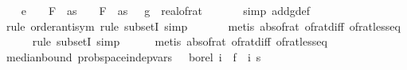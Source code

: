 \begin{isabellebody}
\ \ \isamarkupfalse%
\ e{\isacharcolon}{\kern0pt}\ {\isachardoublequoteopen}{\isacharbraceleft}{\kern0pt}{\isasymomega}{\isachardot}{\kern0pt}\ {\isasymdelta}\ {\isacharasterisk}{\kern0pt}\ F\ {}\ as\ {\isasymge}\ {\isasymbar}{\isasymomega}\ {\isacharminus}{\kern0pt}\ F\ {}\ as{\isasymbar}{\isacharbraceright}{\kern0pt}\ {\isacharequal}{\kern0pt}\ {\isacharbraceleft}{\kern0pt}{\isasymomega}{\isachardot}{\kern0pt}\ {\isacharparenleft}{\kern0pt}g\ {\isasymcirc}\ real{\isacharunderscore}{\kern0pt}of{\isacharunderscore}{\kern0pt}rat{\isacharparenright}{\kern0pt}\ {\isasymomega}{\isacharbraceright}{\kern0pt}{\isachardoublequoteclose}\isanewline
\ \ \ \ \isamarkupfalse%
\ {\isacharparenleft}{\kern0pt}simp\ add{\isacharcolon}{\kern0pt}g{\isacharunderscore}{\kern0pt}def{\isacharparenright}{\kern0pt}\isanewline
\ \ \ \ \isamarkupfalse%
\ {\isacharparenleft}{\kern0pt}rule\ order{\isacharunderscore}{\kern0pt}antisym{\isacharcomma}{\kern0pt}\ rule\ subsetI{\isacharcomma}{\kern0pt}\ simp{\isacharparenright}{\kern0pt}\ \isanewline
\ \ \ \ \isamarkupfalse%
\ {\isacharparenleft}{\kern0pt}metis\ abs{\isacharunderscore}{\kern0pt}of{\isacharunderscore}{\kern0pt}rat\ of{\isacharunderscore}{\kern0pt}rat{\isacharunderscore}{\kern0pt}diff\ of{\isacharunderscore}{\kern0pt}rat{\isacharunderscore}{\kern0pt}less{\isacharunderscore}{\kern0pt}eq{\isacharparenright}{\kern0pt}\isanewline
\ \ \ \ \isamarkupfalse%
\ {\isacharparenleft}{\kern0pt}rule\ subsetI{\isacharcomma}{\kern0pt}\ simp{\isacharparenright}{\kern0pt}\isanewline
\ \ \ \ \isamarkupfalse%
\ {\isacharparenleft}{\kern0pt}metis\ abs{\isacharunderscore}{\kern0pt}of{\isacharunderscore}{\kern0pt}rat\ of{\isacharunderscore}{\kern0pt}rat{\isacharunderscore}{\kern0pt}diff\ of{\isacharunderscore}{\kern0pt}rat{\isacharunderscore}{\kern0pt}less{\isacharunderscore}{\kern0pt}eq{\isacharparenright}{\kern0pt}\isanewline
\isanewline
\ \ \isamarkupfalse%
\ median{\isacharunderscore}{\kern0pt}bound{\isacharunderscore}{\kern0pt}{}{\isacharprime}{\kern0pt}{\isacharcolon}{\kern0pt}\ {\isachardoublequoteopen}prob{\isacharunderscore}{\kern0pt}space{\isachardot}{\kern0pt}indep{\isacharunderscore}{\kern0pt}vars\ {\isasymOmega}\ {\isacharparenleft}{\kern0pt}{\isasymlambda}{\isacharunderscore}{\kern0pt}{\isachardot}{\kern0pt}\ borel{\isacharparenright}{\kern0pt}\ {\isacharparenleft}{\kern0pt}{\isasymlambda}i\ {\isasymomega}{\isachardot}{\kern0pt}\ f{}\ {\isasymomega}\ i{\isacharparenright}{\kern0pt}\ {\isacharbraceleft}{\kern0pt}{}{\isachardot}{\kern0pt}{\isachardot}{\kern0pt}{\isacharless}{\kern0pt}s\isanewline

\end{isabellebody}
